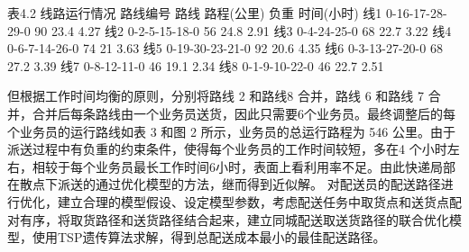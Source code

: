 表4.2 线路运行情况
路线编号	路线	路程(公里)	负重	时间(小时)
线1	0-16-17-28-29-0	90	23.4	4.27
线2	0-2-5-15-18-0	56	24.8	2.91
线3	0-4-24-25-0	68	22.7	3.22
线4	0-6-7-14-26-0	74	21	3.63
线5	0-19-30-23-21-0	92	20.6	4.35
线6	0-3-13-27-20-0	68	27.2	3.39
线7	0-8-12-11-0	46	19.1	2.34
线8	0-1-9-10-22-0	46	22.7	2.51

但根据工作时间均衡的原则，分别将路线 2 和路线8 合并，路线 6 和路线 7 合并，合并后每条路线由一个业务员送货，因此只需要6个业务员。最终调整后的每个业务员的运行路线如表 3 和图 2 所示，业务员的总运行路程为 546 公里。由于派送过程中有负重的约束条件，使得每个业务员的工作时间较短，多在4 个小时左右，相较于每个业务员最长工作时间6小时，表面上看利用率不足。由此快递局部在散点下派送的通过优化模型的方法，继而得到近似解。
对配送员的配送路径进行优化，建立合理的模型假设、设定模型参数，考虑配送任务中取货点和送货点配对有序，将取货路径和送货路径结合起来，建立同城配送取送货路径的联合优化模型，使用TSP遗传算法求解，得到总配送成本最小的最佳配送路径。

